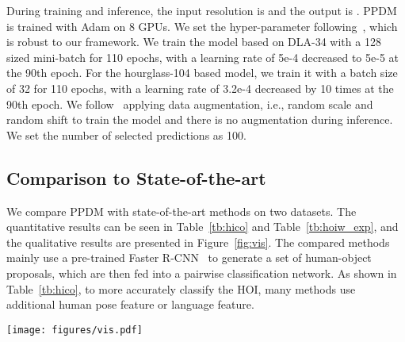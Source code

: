\documentclass[10pt,twocolumn,letterpaper]{article}
\begin{document}
During training and inference, the input resolution is  and the output is . PPDM is trained with Adam on 8 GPUs. We set the hyper-parameter following~\cite{zhou2019objects}, which is robust to our framework. We train the model based on DLA-34 with a 128 sized mini-batch for 110 epochs, with a learning rate of 5e-4 decreased to 5e-5 at the 90th epoch. For the hourglass-104 based model, we train it with a batch size of 32 for 110 epochs, with a learning rate of 3.2e-4 decreased by 10 times at the 90th epoch. We follow~\cite{law2018cornernet,zhou2019objects} applying data augmentation, i.e., random scale and random shift to train the model and there is no augmentation during inference. We set the number of selected predictions  as 100.

\vspace{-1.5mm}
\subsection{Comparison to State-of-the-art}
\vspace{-1.5mm}
We compare PPDM with state-of-the-art methods on two datasets. The quantitative results can be seen in Table~\ref{tb:hico} and Table~\ref{tb:hoiw_exp}, and the qualitative results are presented in Figure~\ref{fig:vis}. The compared methods mainly use a pre-trained Faster R-CNN~\cite{ren2015faster} to generate a set of human-object proposals, which are then fed into a pairwise classification network. As shown in Table~\ref{tb:hico}, to more accurately classify the HOI, many methods use additional human pose feature or language feature. 
\begin{figure*}[h]
  \vspace{-2mm}
  \centering
  \texttt{[image: figures/vis.pdf]}
  \vspace{-2mm}
  \caption{Visualization results compared with iCAN on HICO-Det. The first row is the prediction of iCAN and the second row by PPDM. Purple denotes the subject and red is the object. If a subject has interaction with an object, they will be linked by a green line. We show results with top-3 confidence per image: 1-blue, 2-yellow, 3-pink. The `no' denotes `no-interaction'.}
  \label{fig:vis}
  \vspace{-4mm}
\end{figure*}

\vspace{-2.5mm}
\end{document}
